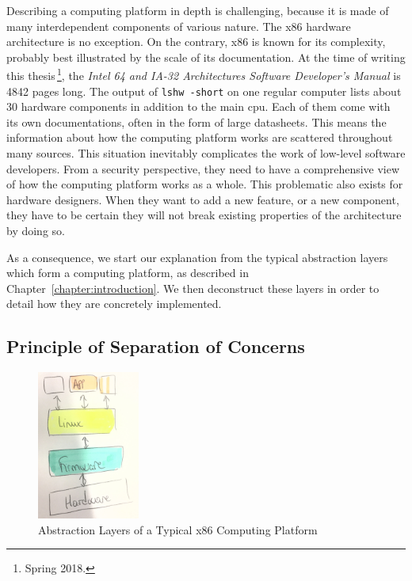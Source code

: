 
Describing a computing platform in depth is challenging, because it is made of
many interdependent components of various nature.
%
The x86 hardware architecture is no exception.
%
On the contrary, x86 is known for its complexity, probably best illustrated by
the scale of its documentation.
%
At the time of writing this thesis\,\footnote{Spring 2018.}, the \emph{Intel 64
  and IA-32 Architectures Software Developer’s Manual} is 4842 pages long.
%
The output of \texttt{lshw -short} on one regular computer lists about 30
hardware components in addition to the main \ac{cpu}.
%
Each of them come with its own documentations, often in the form of large
datasheets.
%
This means the information about how the computing platform works are scattered
throughout many sources.
%
This situation inevitably complicates the work of low-level software developers.
%
From a security perspective, they need to have a comprehensive view of how the
computing platform works as a whole.
%
This problematic also exists for hardware designers.
%
When they want to add a new feature, or a new component, they have to be certain
they will not break existing properties of the architecture by doing so.

%
As a consequence, we start our explanation from the typical abstraction layers
which form a computing platform, as described in
Chapter~\ref{chapter:introduction}.
%
We then deconstruct these layers in order to detail how they are concretely
implemented.

\subsection{Principle of Separation of Concerns}

\begin{figure}
  \centering
  \includegraphics[width=0.3\textwidth]{Figures/computing-platform-1.jpg}
  \caption{Abstraction Layers of a Typical x86 Computing Platform}
  \label{fig:usecase:computing-platform-1}
\end{figure}

